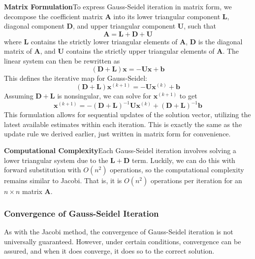 \textbf{Matrix Formulation}\quad To express Gauss-Seidel iteration in matrix form, we decompose the coefficient matrix $\mathbf{A}$ into its lower triangular component $\mathbf{L}$, diagonal component $\mathbf{D}$, and upper triangular component $\mathbf{U}$, such that
\begin{equation*}
    \mathbf{A} = \mathbf{L} + \mathbf{D} + \mathbf{U}
\end{equation*}
where $\mathbf{L}$ contains the strictly lower triangular elements of $\mathbf{A}$, $\mathbf{D}$ is the diagonal matrix of $\mathbf{A}$, and $\mathbf{U}$ contains the strictly upper triangular elements of $\mathbf{A}$. The linear system can then be rewritten as
\begin{equation*}
    (\mathbf{D} + \mathbf{L})\mathbf{x} = -\mathbf{U}\mathbf{x} + \mathbf{b}
\end{equation*}
This defines the iterative map for Gauss-Seidel:
\begin{equation*}
    (\mathbf{D} + \mathbf{L})\mathbf{x}^{(k+1)} = -\mathbf{U}\mathbf{x}^{(k)} + \mathbf{b}
\end{equation*}
Assuming $\mathbf{D} + \mathbf{L}$ is nonsingular, we can solve for $\mathbf{x}^{(k+1)}$ to get
\begin{equation*}
    \mathbf{x}^{(k+1)} = -(\mathbf{D} + \mathbf{L})^{-1}\mathbf{U}\mathbf{x}^{(k)} + (\mathbf{D} + \mathbf{L})^{-1}\mathbf{b}
\end{equation*}
This formulation allows for sequential updates of the solution vector, utilizing the latest available estimates within each iteration. This is exactly the same as the update rule we derived earlier, just written in matrix form for convenience.

\textbf{Computational Complexity}\quad Each Gauss-Seidel iteration involves solving a lower triangular system due to the $\mathbf{L} + \mathbf{D}$ term. Luckily, we can do this with forward substitution with $O(n^2)$ operations, so the computational complexity remains similar to Jacobi. That is, it is $O(n^2)$ operations per iteration for an $n \times n$ matrix $\mathbf{A}$.

\subsubsection{Convergence of Gauss-Seidel Iteration}
As with the Jacobi method, the convergence of Gauss-Seidel iteration is not universally guaranteed. However, under certain conditions, convergence can be assured, and when it does converge, it does so to the correct solution.

